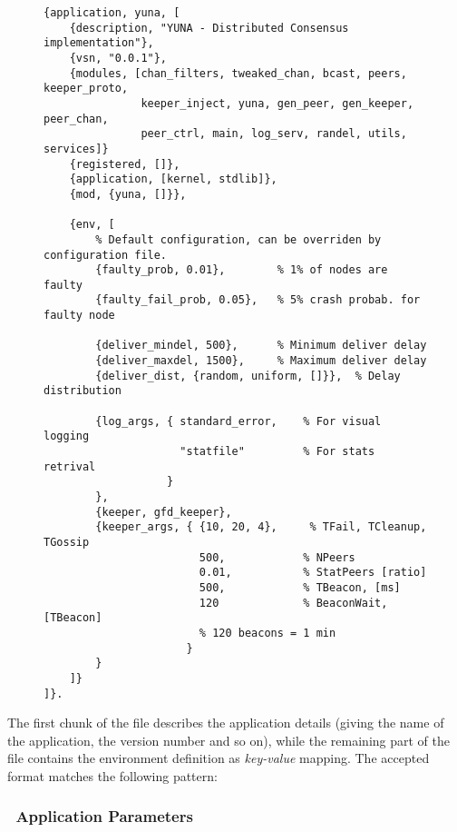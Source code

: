 \begin{figure}[hbt]
\begin{lstlisting}[label={code:ConfFile},
                   caption={default configuration file}]
{application, yuna, [
    {description, "YUNA - Distributed Consensus implementation"},
    {vsn, "0.0.1"},
    {modules, [chan_filters, tweaked_chan, bcast, peers, keeper_proto,
               keeper_inject, yuna, gen_peer, gen_keeper, peer_chan,
               peer_ctrl, main, log_serv, randel, utils, services]}
    {registered, []},
    {application, [kernel, stdlib]},
    {mod, {yuna, []}},

    {env, [
        % Default configuration, can be overriden by configuration file.
        {faulty_prob, 0.01},        % 1% of nodes are faulty
        {faulty_fail_prob, 0.05},   % 5% crash probab. for faulty node

        {deliver_mindel, 500},      % Minimum deliver delay
        {deliver_maxdel, 1500},     % Maximum deliver delay
        {deliver_dist, {random, uniform, []}},  % Delay distribution

        {log_args, { standard_error,    % For visual logging
                     "statfile"         % For stats retrival
                   }
        },
        {keeper, gfd_keeper},
        {keeper_args, { {10, 20, 4},     % TFail, TCleanup, TGossip
                        500,            % NPeers
                        0.01,           % StatPeers [ratio]
                        500,            % TBeacon, [ms]
                        120             % BeaconWait, [TBeacon]
                        % 120 beacons = 1 min
                      }
        }
    ]}
]}.
\end{lstlisting}
\end{figure}

The first chunk of the file describes the application details (giving
the name of the application, the version number and so on), while the
remaining part of the file contains the environment definition as
\emph{key-value} mapping. The accepted format matches the following
pattern:

\begin{quote}
\centering
{}
\end{quote}

\subsubsection{\YUNA\ Application Parameters} \label{subsub:YUNAParams}

